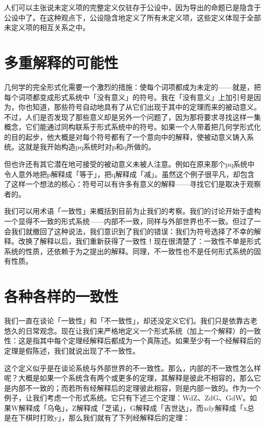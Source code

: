 \documentclass[
  12pt,
  twoside,
  openright,
  oldfontcommands,
]{memoir}
\begin{document}
人们可以主张说未定义项的完整定义仅驻存于公设中，因为导出的命题已是隐含于公设中了。在这种观点下，公设隐含地定义了所有未定义项，这些定义体现于全部未定义项的相互关系之中。

\section{多重解释的可能性}

几何学的完全形式化需要一个激烈的措施：使每个词项都成为未定的------就是，把每个词项都变成形式系统中「没有意义」的符号。我在「没有意义」上加引号是因为，你也知道，那些符号自动地具有了从它们出现于其中的定理而来的被动意义。不过，人们是否发现了那些意义却是另外一个问题了，因为那将要求寻找这样一集概念，它们能通过同构联系于形式系统中的符号。如果一个人带着把几何学形式化的目的起步，他大概是对每个符号都有了一个意向中的解释，使被动意义铸入系统。这就是我开始构造pq系统时对p和q所做的。

但也许还有其它潜在地可接受的被动意义未被人注意。例如在原来那个pq系统中令人意外地把p解释成「等于」，把q解释成「减」。虽然这个例子很平凡，却包含了这样一个想法的核心：符号可以有许多有意义的解释------寻找它们是取决于观察者的。

我们可以用术语「一致性」来概括到目前为止我们的考察。我们的讨论开始于虚构一个显得不一致的形式系统------内部不一致，同样与外部世界也不一致。但过了一会我们就撤回了这种说法，我们意识到了我们的错误：我们为符号选择了不幸的解释。改换了解释以后，我们重新获得了一致性！现在很清楚了：一致性不单是形式系统的性质，还依赖于为之提出的解释。同理，不一致性也不是任何形式系统的固有性质。

\section{各种各样的一致性}

我们一直在谈论「一致性」和「不一致性」，却还没定义它们。我们只是依靠古老悠久的日常观念。现在让我们来严格地定义一个形式系统（加上一个解释）的一致性：这是指其中每个定理经解释后都成为一个真陈述。如果至少有一个经解释后的定理是假陈述，我们就说出现了不一致性。

这个定义似乎是在谈论系统与外部世界的不一致性。那么，内部的不一致性怎么样呢？大概是如果一个系统含有两个或更多的定理，其解释是彼此不相容的，那么它是内部不一致的；而若所有经解释后的定理彼此相容，则是内部一致的。作为一个例子，让我们考虑一个形式系统。它只有下述三个定理：WdZ、ZdG、GdW。如果W解释成「乌龟」，Z解释成「芝诺」，G解释成「吉世达」，而xdy解释成「x总是在下棋时打败y」，那么我们就有了下列经解释后的定理：
\end{document}
